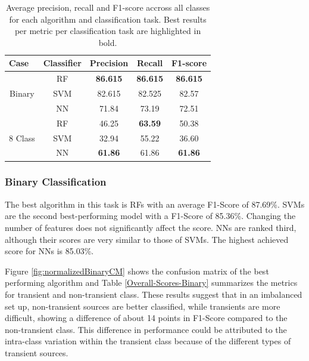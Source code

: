 \documentclass{aastex62}
\begin{document}
\begin{table}
\centering
\begin{tabular}{ccccc}
\hline
\multicolumn{1}{l}{\textbf{Case}} & \textbf{Classifier} & \textbf{Precision} & \textbf{Recall} & \textbf{F1-score} \\ \hline \hline
\multirow{3}{*}{Binary}                 & RF                  & \textbf{86.615}    & \textbf{86.615} & \textbf{86.615}   \\
                                        & SVM                 & 82.615             & 82.525          & 82.57             \\
                                        & NN                  & 71.84              & 73.19           & 72.51             \\ \hline
\multirow{3}{*}{8 Class}                & RF                  & 46.25              & \textbf{63.59}  & 50.38             \\
                                        & SVM                 & 32.94              & 55.22           & 36.60             \\
                                        & NN                  & \textbf{61.86}     & 61.86           & \textbf{61.86}   \\ \hline
\end{tabular}%
\caption{Average precision, recall and F1-score accross all classes for each algorithm and classification task. Best results per metric per classification task are highlighted in bold.}
\label{table:all-avg-results}
\end{table}

\subsubsection{Binary Classification} 
\label{Results-Binary} 

The best algorithm in this task is RFs with an average F1-Score of
87.69\%.   
SVMs are the second best-performing model with a F1-Score of 85.36\%. 
Changing the number of features does not significantly affect the score.
NNs are ranked third, although their scores are very similar to those of SVMs. 
The highest achieved score for NNs is 85.03\%.

Figure \ref{fig:normalizedBinaryCM} shows the confusion matrix of the best
performing algorithm and Table \ref{Overall-Scores-Binary} summarizes 
the metrics for transient and non-transient class. These results suggest 
that in an imbalanced set up, non-transient sources are better classified, 
while transients are more difficult, showing a difference of about 
14 points in F1-Score compared to the non-transient class. 
This difference in performance could be attributed to the intra-class
variation within the transient class because of the different 
types of transient sources.  
\end{document}

